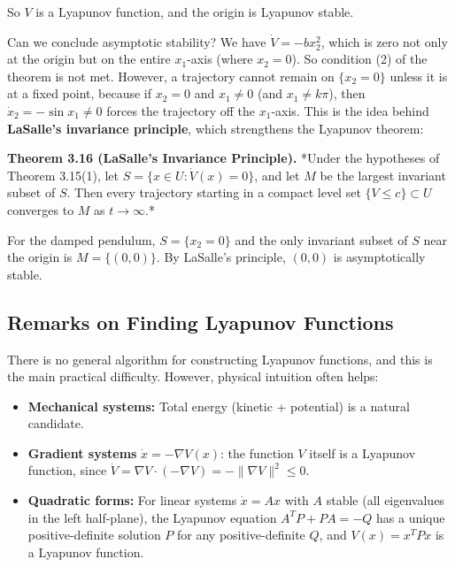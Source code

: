So $V$ is a Lyapunov function, and the origin is Lyapunov stable.

Can we conclude asymptotic stability? We have $\dot{V} = -bx_2^2$, which is zero not only at the origin but on the entire $x_1$-axis (where $x_2 = 0$). So condition (2) of the theorem is not met. However, a trajectory cannot remain on $\{x_2 = 0\}$ unless it is at a fixed point, because if $x_2 = 0$ and $x_1 \neq 0$ (and $x_1 \neq k\pi$), then $\dot{x}_2 = -\sin x_1 \neq 0$ forces the trajectory off the $x_1$-axis. This is the idea behind \textbf{LaSalle's invariance principle}, which strengthens the Lyapunov theorem:

\textbf{Theorem 3.16 (LaSalle's Invariance Principle).} *Under the hypotheses of Theorem 3.15(1), let $S = \{x \in U : \dot{V}(x) = 0\}$, and let $M$ be the largest invariant subset of $S$. Then every trajectory starting in a compact level set $\{V \leq c\} \subset U$ converges to $M$ as $t \to \infty$.*

For the damped pendulum, $S = \{x_2 = 0\}$ and the only invariant subset of $S$ near the origin is $M = \{(0,0)\}$. By LaSalle's principle, $(0,0)$ is asymptotically stable.

\subsection{Remarks on Finding Lyapunov Functions}\label{sec:3.7.3}

There is no general algorithm for constructing Lyapunov functions, and this is the main practical difficulty. However, physical intuition often helps:

\begin{itemize}[nosep]
  \item \textbf{Mechanical systems:} Total energy (kinetic + potential) is a natural candidate.
  \item \textbf{Gradient systems} $\dot{x} = -\nabla V(x)$: the function $V$ itself is a Lyapunov function, since $\dot{V} = \nabla V \cdot (-\nabla V) = -\|\nabla V\|^2 \leq 0$.
  \item \textbf{Quadratic forms:} For linear systems $\dot{x} = Ax$ with $A$ stable (all eigenvalues in the left half-plane), the Lyapunov equation $A^T P + PA = -Q$ has a unique positive-definite solution $P$ for any positive-definite $Q$, and $V(x) = x^T P x$ is a Lyapunov function.


\bigskip

\end{itemize}

